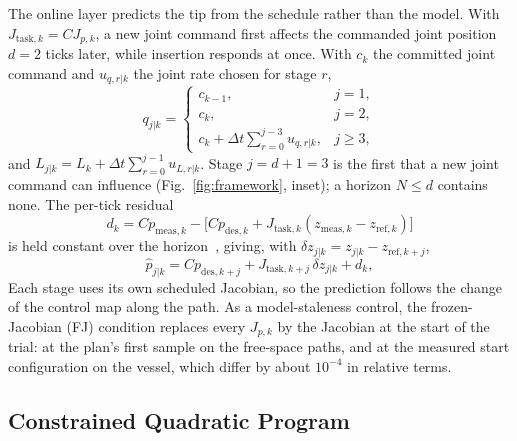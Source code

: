 \documentclass[journal]{IEEEtran}
\begin{document}
The online layer predicts the tip from the schedule rather than the model.
With $J_{\mathrm{task},k}=CJ_{p,k}$, a new joint command first affects the
commanded joint position $d=2$ ticks later, while insertion responds at
once. With $c_k$ the committed joint command and $u_{q,r|k}$ the joint rate
chosen for stage $r$,
\begin{equation}
q_{j|k}=
\begin{cases}
c_{k-1}, & j=1,\\
c_{k}, & j=2,\\
c_k+\Delta t\sum_{r=0}^{j-3}u_{q,r|k}, & j\ge3,
\end{cases}
\label{eq:delay}
\end{equation}
and $L_{j|k}=L_k+\Delta t\sum_{r=0}^{j-1}u_{L,r|k}$. Stage $j=d+1=3$ is the
first that a new joint command can influence (Fig.~\ref{fig:framework},
inset); a horizon $N\le d$ contains none. The per-tick residual
\begin{equation}
d_k=Cp_{\mathrm{meas},k}-\big[Cp_{\mathrm{des},k}
+J_{\mathrm{task},k}(z_{\mathrm{meas},k}-z_{\mathrm{ref},k})\big]
\label{eq:residual}
\end{equation}
is held constant over the horizon~\cite{maeder2009linear}, giving, with $\delta z_{j|k}=z_{j|k}-z_{\mathrm{ref},k+j}$,
\begin{equation}
\hat p_{j|k}=Cp_{\mathrm{des},k+j}+J_{\mathrm{task},k+j}\,
\delta z_{j|k}+d_k,
\label{eq:pred}
\end{equation}
Each stage uses its own scheduled Jacobian, so the prediction follows the
change of the control map along the path. As a model-staleness control,
the frozen-Jacobian (FJ) condition replaces every $J_{p,k}$ by the
Jacobian at the start of the trial: at the plan's first sample on the
free-space paths, and at the measured start configuration on the vessel,
which differ by about $10^{-4}$ in relative terms.

\subsection{Constrained Quadratic Program}
\label{sec:mpc}
\end{document}
